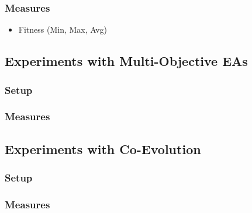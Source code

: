 \subsubsection{Measures}
\begin{itemize}
    \item Fitness (Min, Max, Avg)
\end{itemize}

\subsection{Experiments with Multi-Objective EAs}
\subsubsection{Setup}
\subsubsection{Measures}

\subsection{Experiments with Co-Evolution}
\subsubsection{Setup}
\subsubsection{Measures}

\iffalse
\subsection{Experiments with Human Interaction}
\subsubsection{Setup}
\begin{itemize}
    \item Number of turns
    \item Random Start-population
    \item Fixed Start-population
\end{itemize}
\subsubsection{Measures}
\begin{itemize}
    \item Fitness (Min, Max, Avg)
    \item Time complexity
    \item Space complexity
\end{itemize}
\fi

